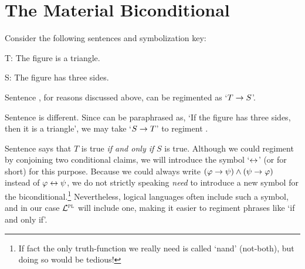 %
%
%

\section{The Material Biconditional}
  \label{sec.biconditional}

Consider the following sentences and symbolization key:

\begin{earg} \label{triangle}
\end{earg}

\begin{ekey}
\item[T:] The figure is a triangle.
\item[S:] The figure has three sides.
\end{ekey}

Sentence , for reasons discussed above, can be regimented as `$T\rightarrow S$'.

Sentence  is different.
Since  can be paraphrased as, `If the figure has three sides, then it is a triangle', we may take `$S\rightarrow T$' to regiment .

Sentence  says that $T$ is true \emph{if and only if} $S$ is true.
Although we could regiment  by conjoining two conditional claims, we will introduce the  symbol `$\leftrightarrow$' (or  for short) for this purpose.
Because we could always write $(\varphi \rightarrow \psi) \wedge (\psi \rightarrow \varphi)$ instead of $\varphi \leftrightarrow \psi$, we do not strictly speaking \textit{need} to introduce a new symbol for the biconditional.\footnote{If fact the only truth-function we really need is called `nand' (not-both), but doing so would be tedious!} 
Nevertheless, logical languages often include such a symbol, and in our case $\mathcal{L}^{\textsc{pl}}$ will include one, making it easier to regiment phrases like `if and only if'.

